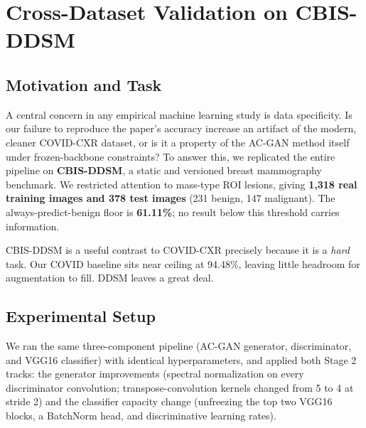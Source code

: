 %
%

\section{Cross-Dataset Validation on CBIS-DDSM}
\label{sec:ddsm}

\subsection{Motivation and Task}

A central concern in any empirical machine learning study is data specificity. Is our failure to
reproduce the paper's accuracy increase an artifact of the modern, cleaner COVID-CXR dataset, or is it
a property of the AC-GAN method itself under frozen-backbone constraints? To answer this, we
replicated the entire pipeline on \textbf{CBIS-DDSM}, a static and versioned breast mammography
benchmark. We restricted attention to mass-type ROI lesions, giving \textbf{1{,}318 real training
images and 378 test images} (231 benign, 147 malignant). The always-predict-benign floor is
\textbf{61.11\%}; no result below this threshold carries information.

CBIS-DDSM is a useful contrast to COVID-CXR precisely because it is a \emph{hard} task. Our COVID
baseline sits near ceiling at 94.48\%, leaving little headroom for augmentation to fill. DDSM leaves
a great deal.

\subsection{Experimental Setup}

We ran the same three-component pipeline (AC-GAN generator, discriminator, and VGG16 classifier) with
identical hyperparameters, and applied both Stage 2 tracks: the generator improvements (spectral
normalization on every discriminator convolution; transpose-convolution kernels changed from 5 to 4 at
stride 2) and the classifier capacity change (unfreezing the top two VGG16 blocks, a BatchNorm head,
and discriminative learning rates).

